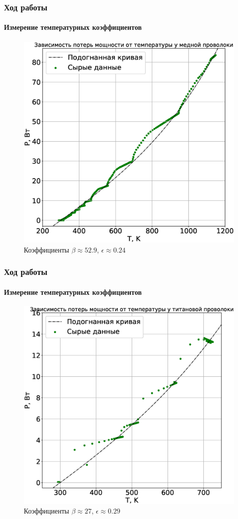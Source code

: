 \documentclass[8pt,pdf,hyperref={unicode}]{beamer}
\begin{document}
\begin{frame}
	\frametitle{Ход работы}
	\framesubtitle{Измерение температурных коэффициентов}
	\begin{center}
			\begin{figure}[h!]
			\centering
			\includegraphics[width=.55\linewidth]{Lab3_6.eps}
			\caption{Коэффициенты $\beta \approx 52.9$, $\epsilon \approx 0.24$}
			\label{fig6}
		\end{figure}		
	\end{center}
\end{frame}
\begin{frame}
	\frametitle{Ход работы}
	\framesubtitle{Измерение температурных коэффициентов}
	\begin{center}
			\begin{figure}[h!]
			\centering
			\includegraphics[width=.55\linewidth]{Lab3_7.eps}
			\caption{Коэффициенты $\beta \approx 27$, $\epsilon \approx 0.29$}
			\label{fig}
		\end{figure}		
	\end{center}
\end{frame}
\end{document}
